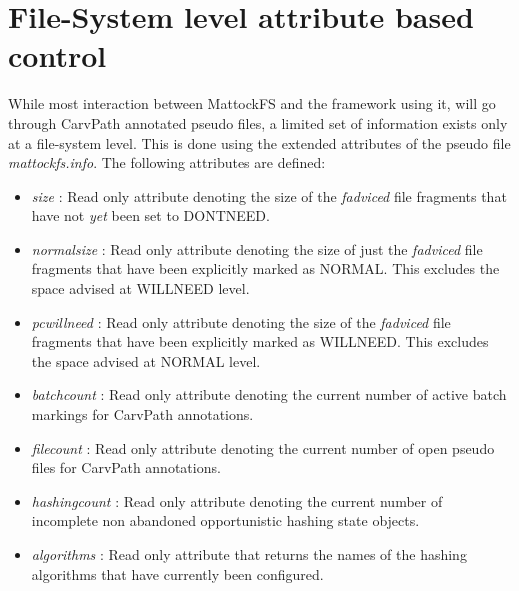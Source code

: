 \section{File-System level attribute based control}
While most interaction between MattockFS and the framework using it, will go through CarvPath annotated pseudo files, a limited set of information exists only at a file-system level. This is done using the extended attributes of the pseudo file \emph{mattockfs.info}. The following attributes are defined:
\begin{itemize}
\item \emph{size} : Read only attribute denoting the size of the \emph{fadviced} file fragments that have not \emph{yet} been set to DONTNEED.
\item \emph{normalsize} : Read only attribute denoting the size of just the \emph{fadviced} file fragments that have been explicitly marked as NORMAL. This excludes the space advised at WILLNEED level.
\item \emph{pcwillneed} : Read only attribute denoting the size of the \emph{fadviced} file fragments that have been explicitly marked as WILLNEED. This excludes the space advised at NORMAL level.
\item \emph{batchcount} : Read only attribute denoting the current number of active batch markings for CarvPath annotations.
\item \emph{filecount} : Read only attribute denoting the current number of open pseudo files for CarvPath annotations.
\item \emph{hashingcount} : Read only attribute denoting the current number of incomplete non abandoned opportunistic hashing state objects.
\item \emph{algorithms} : Read only attribute that returns the names of the hashing algorithms that have currently been configured.
\end{itemize}
